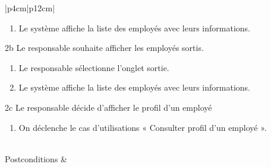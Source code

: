 \begin{longtable}{|p{4cm}|p{12cm}|}
\begin{minipage}[t]{\linewidth}
\begin{enumerate}[ nosep,after=\strut, ]
                                      \item Le système affiche la liste des employés avec leurs informations.  
                                \end{enumerate}
                                2b Le responsable souhaite afficher les employés sortis.
                                \begin{enumerate}[ nosep,after=\strut, ]
                                      \item Le responsable sélectionne l’onglet sortie.  
                                      \item Le système affiche la liste des employés avec leurs informations. 
                                \end{enumerate}
                                2c Le responsable décide d’afficher le profil d’un employé
                                \begin{enumerate}[ nosep,after=\strut, ]
                                      \item On déclenche le cas d’utilisations « Consulter profil d'un employé ». 
                                \end{enumerate}
                    \end{minipage}
                    \\
                    
                    \hline
                    Postconditions &   \\
                    \hline
                    \caption{Description du cas d'utilisation « Consulter la liste des employés »}\\
            \end{longtable}    
   
